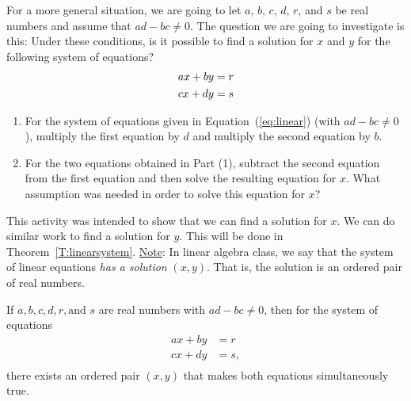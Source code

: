 For a more general situation, we are going to let  $a$, $b$, $c$, $d$, $r$, and $s$  be real numbers and assume that  $ad - bc \ne 0$.  The question we are going to investigate is this:  Under these conditions, is it possible to find a solution for  $x$  and  $y$  for the following system of equations?
%
\setcounter{equation}{0}
\begin{align}
  ax + by &= r \notag \\
  cx + dy &= s 
  \label{eq:linear}
\end{align} 
\hbreak
%
\begin{activity} \label{A:linearsystem} \hfill
\begin{enumerate}
\item For the system of equations given in Equation~(\ref{eq:linear}) (with $ad - bc \ne 0$), multiply the first equation by  $d$  and multiply the second equation by  $b$.

\item For the two equations obtained in  Part (1), subtract the second equation from the first equation and then solve the resulting equation for  $x$.  What assumption was needed in order to solve this equation for  $x$?
\end{enumerate}
\end{activity}
%
This activity was intended to show that we can find a solution for  $x$.  We can do similar work to find a solution for  $y$.  This will be done in Theorem~\ref{T:linearsystem}.
\vskip10pt
\noindent
\underline{Note}:  In linear algebra class, we say that the system of linear equations \emph{has a solution} 
$\left( x, y \right)$.  That is, the solution is an ordered pair of real numbers.
\hbreak
%
\begin{theorem} \label{T:linearsystem}
If  $a,b,c,d,r,\text{and }s$ are real numbers with  $ad - bc \ne 0$, then for the system of equations
\[
\begin{aligned}
  ax + by & = r  \\
  cx + dy & = s,  \\ 
\end{aligned}
\]
there exists an ordered pair $\left( x, y \right)$ that makes both equations simultaneously true.
\end{theorem}
%
\setcounter{equation}{0}
